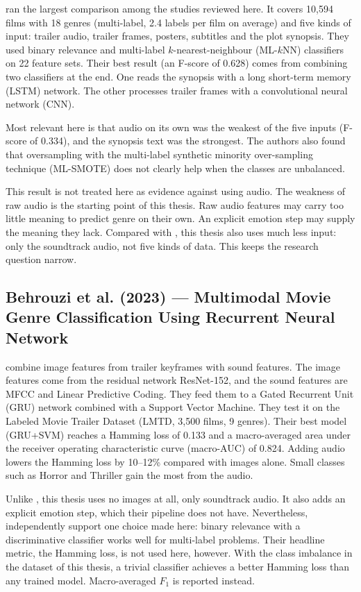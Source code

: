 \citet{mangolin2020multimodal} ran the largest comparison among the studies reviewed here. It covers 10,594 films with 18 genres (multi-label, 2.4 labels per film on average) and five kinds of input: trailer audio, trailer frames, posters, subtitles and the plot synopsis. They used binary relevance and multi-label $k$-nearest-neighbour (ML-$k$NN) classifiers on 22 feature sets. Their best result (an F-score of 0.628) comes from combining two classifiers at the end. One reads the synopsis with a long short-term memory (LSTM) network. The other processes trailer frames with a convolutional neural network (CNN).

Most relevant here is that audio on its own was the weakest of the five inputs (F-score of 0.334), and the synopsis text was the strongest. The authors also found that oversampling with the multi-label synthetic minority over-sampling technique (ML-SMOTE) does not clearly help when the classes are unbalanced.

This result is not treated here as evidence against using audio. The weakness of raw audio is the starting point of this thesis. Raw audio features may carry too little meaning to predict genre on their own. An explicit emotion step may supply the meaning they lack. Compared with \citet{mangolin2020multimodal}, this thesis also uses much less input: only the soundtrack audio, not five kinds of data. This keeps the research question narrow.

\subsection{Behrouzi et al. (2023) --- Multimodal Movie Genre Classification Using Recurrent Neural Network}

\citet{behrouzi2023multimodal} combine image features from trailer keyframes with sound features. The image features come from the residual network ResNet-152, and the sound features are MFCC and Linear Predictive Coding. They feed them to a Gated Recurrent Unit (GRU) network combined with a Support Vector Machine. They test it on the Labeled Movie Trailer Dataset (LMTD, 3,500 films, 9 genres). Their best model (GRU+SVM) reaches a Hamming loss of 0.133 and a macro-averaged area under the receiver operating characteristic curve (macro-AUC) of 0.824. Adding audio lowers the Hamming loss by 10--12\% compared with images alone. Small classes such as Horror and Thriller gain the most from the audio.

Unlike \citet{behrouzi2023multimodal}, this thesis uses no images at all, only soundtrack audio. It also adds an explicit emotion step, which their pipeline does not have. Nevertheless, \citeauthor{behrouzi2023multimodal} independently support one choice made here: binary relevance with a discriminative classifier works well for multi-label problems. Their headline metric, the Hamming loss, is not used here, however. With the class imbalance in the dataset of this thesis, a trivial classifier achieves a better Hamming loss than any trained model. Macro-averaged $F_1$ is reported instead.

